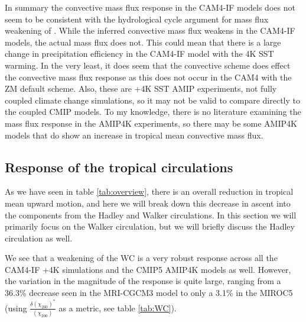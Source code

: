 \documentclass[letterpaper,12pt,titlepage,oneside,final]{book}
\begin{document}
In summary the convective mass flux response in the CAM4-IF models does not seem to be consistent with the hydrological cycle argument for mass flux weakening of \citep{held_robust_2006}. While the inferred convective mass flux weakens in the CAM4-IF models, the actual mass flux does not. This could mean that there is a large change in precipitation efficiency in the CAM4-IF model with the 4K SST warming. In the very least, it does seem that the convective scheme does effect the convective mass flux response as this does not occur in the CAM4 with the ZM default scheme. Also, these are +4K SST AMIP experiments, not fully coupled climate change simulations, so it may not be valid to compare directly to the coupled CMIP models. To my knowledge, there is no literature examining the mass flux response in the AMIP4K experiments, so there may be some AMIP4K models that do show an increase in tropical mean convective mass flux.

\subsection{Response of the tropical circulations} 

As we have seen in table \ref{tab:overview}, there is an overall reduction in tropical mean upward motion, and here we will break down this decrease in ascent into the components from the Hadley and Walker circulations. In this section we will primarily focus on the Walker circulation, but we will briefly discuss the Hadley circulation as well. 


We see that a weakening of the WC is a very robust response across all the CAM4-IF +4K simulations and the CMIP5 AMIP4K models as well. However, the variation in the magnitude of the response is quite large, ranging from a 36.3\% decrease seen in the MRI-CGCM3 model to only a 3.1\% in the MIROC5 (using $\frac{\delta(\chi_{200})^{*}}{(\chi_{200})}$ as a metric, see table \ref{tab:WC}).
\end{document}
